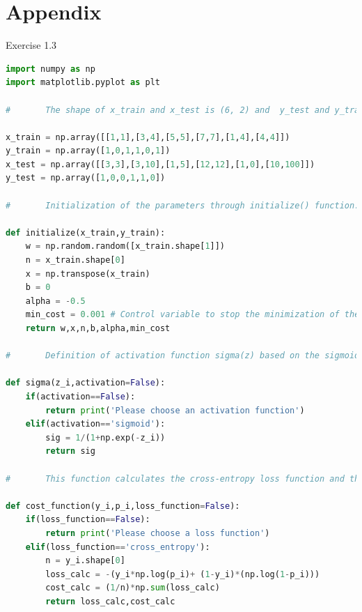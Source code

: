 \documentclass{article}
\begin{document}
\section{Appendix}
Exercise 1.3
\begin{lstlisting}[language=Python]
import numpy as np
import matplotlib.pyplot as plt

#		The shape of x_train and x_test is (6, 2) and  y_test and y_train is (6,). Each vector has two features x1,x2 that belongs to a class y=0 or y=1. If x1=x2 or #  x1>x2 then y = 0 otherwise y=0.

x_train = np.array([[1,1],[3,4],[5,5],[7,7],[1,4],[4,4]]) 
y_train = np.array([1,0,1,1,0,1])
x_test = np.array([[3,3],[3,10],[1,5],[12,12],[1,0],[10,100]])
y_test = np.array([1,0,0,1,1,0])

#		Initialization of the parameters through initialize() function. The weights were chosen randomly using a normal distribution with gaussians. The transpose of x_train is initialized for future matrix operations. The initial offset b = 0 and min_cost controls the number of iterations to minimize the cost function by breaking the self-consistent loop when the cost function is lower than 0.001

def initialize(x_train,y_train):
    w = np.random.random([x_train.shape[1]])
    n = x_train.shape[0]
    x = np.transpose(x_train)
    b = 0
    alpha = -0.5
    min_cost = 0.001 # Control variable to stop the minimization of the cost function
    return w,x,n,b,alpha,min_cost
    
#		Definition of activation function sigma(z) based on the sigmoid. the function needs to be called by defining the type of activation. i.e sigma(z,activation='sigmoid'). This is important if we explore possible different activation functions in the next assignments.

def sigma(z_i,activation=False):
    if(activation==False):
        return print('Please choose an activation function')
    elif(activation=='sigmoid'):
        sig = 1/(1+np.exp(-z_i))
        return sig

#		This function calculates the cross-entropy loss function and the cost function. Instead of using for-loops element-wise operations are performed with arrays. You need to define which type of loss function to use: cost_function(y_train,p_i,loss_function='cross_entropy')

def cost_function(y_i,p_i,loss_function=False):
    if(loss_function==False):
        return print('Please choose a loss function')
    elif(loss_function=='cross_entropy'):
        n = y_i.shape[0]
        loss_calc = -(y_i*np.log(p_i)+ (1-y_i)*(np.log(1-p_i)))
        cost_calc = (1/n)*np.sum(loss_calc)
        return loss_calc,cost_calc
        

\end{lstlisting}
\end{document}
